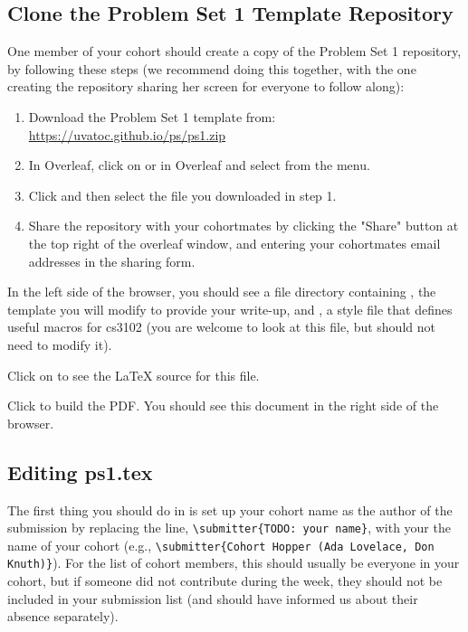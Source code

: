 \documentclass[11pt]{article}
\begin{document}
{\subsection{Clone the Problem Set 1 Template Repository}

One member of your cohort should create a copy of the Problem Set 1 repository, by following these steps (we recommend doing this together, with the one creating the repository sharing her screen for everyone to follow along):

\begin{enumerate}
\item Download the Problem Set 1 template from: \url{https://uvatoc.github.io/ps/ps1.zip}
\item In Overleaf, click on  or  in Overleaf and select  from the menu.
\item Click  and then select the  file you downloaded in step 1.
\item Share the repository with your cohortmates by clicking the "Share" button at the top right of the overleaf window, and entering your cohortmates email addresses in the sharing form.
\end{enumerate}

In the left side of the browser, you should see a file directory containing , the template you will modify to provide your write-up, and , a style file that defines useful macros for cs3102 (you are welcome to look at this file, but should not need to modify it).

Click on  to see the LaTeX source for this file.

Click  to build the PDF. You should see this document in the right side of the browser.

\subsection{Editing ps1.tex}

The first thing you should do in  is set up your cohort name as the author of the submission by replacing the line, \texttt{\textbackslash submitter\{TODO: your name\}}, with your the name of your cohort (e.g., \texttt{\textbackslash submitter\{Cohort Hopper (Ada Lovelace, Don Knuth)\}}). For the list of cohort members, this should usually be everyone in your cohort, but if someone did not contribute during the week, they should not be included in your submission list (and should have informed us about their absence separately).

}
\end{document}
